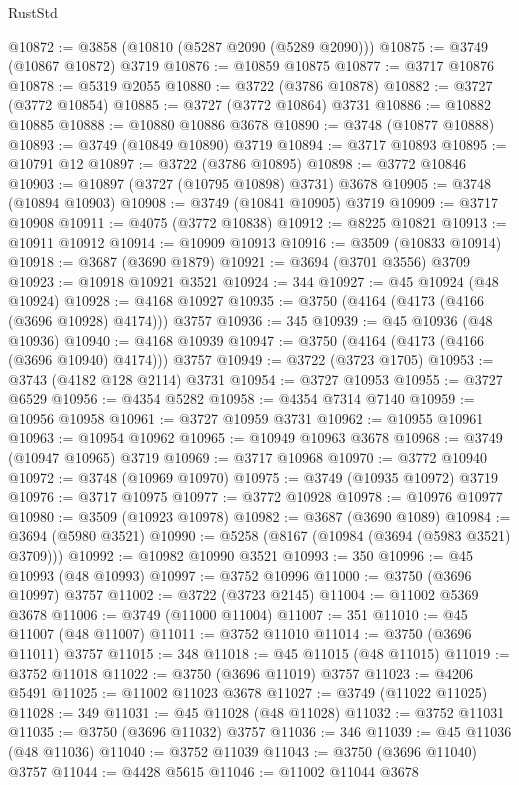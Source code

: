 \begin{lexlean}{RustStd}
\begin{coremodule}
@10872 := @3858 (@10810 (@5287 @2090 (@5289 @2090)))
@10875 := @3749 (@10867 @10872) @3719
@10876 := @10859 @10875
@10877 := @3717 @10876
@10878 := @5319 @2055
@10880 := @3722 (@3786 @10878)
@10882 := @3727 (@3772 @10854)
@10885 := @3727 (@3772 @10864) @3731
@10886 := @10882 @10885
@10888 := @10880 @10886 @3678
@10890 := @3748 (@10877 @10888)
@10893 := @3749 (@10849 @10890) @3719
@10894 := @3717 @10893
@10895 := @10791 @12
@10897 := @3722 (@3786 @10895)
@10898 := @3772 @10846
@10903 := @10897 (@3727 (@10795 @10898) @3731) @3678
@10905 := @3748 (@10894 @10903)
@10908 := @3749 (@10841 @10905) @3719
@10909 := @3717 @10908
@10911 := @4075 (@3772 @10838)
@10912 := @8225 @10821
@10913 := @10911 @10912
@10914 := @10909 @10913
@10916 := @3509 (@10833 @10914)
@10918 := @3687 (@3690 @1879)
@10921 := @3694 (@3701 @3556) @3709
@10923 := @10918 @10921 @3521
@10924 := 344
@10927 := @45 @10924 (@48 @10924)
@10928 := @4168 @10927
@10935 := @3750 (@4164 (@4173 (@4166 (@3696 @10928) @4174))) @3757
@10936 := 345
@10939 := @45 @10936 (@48 @10936)
@10940 := @4168 @10939
@10947 := @3750 (@4164 (@4173 (@4166 (@3696 @10940) @4174))) @3757
@10949 := @3722 (@3723 @1705)
@10953 := @3743 (@4182 @128 @2114) @3731
@10954 := @3727 @10953
@10955 := @3727 @6529
@10956 := @4354 @5282
@10958 := @4354 @7314 @7140
@10959 := @10956 @10958
@10961 := @3727 @10959 @3731
@10962 := @10955 @10961
@10963 := @10954 @10962
@10965 := @10949 @10963 @3678
@10968 := @3749 (@10947 @10965) @3719
@10969 := @3717 @10968
@10970 := @3772 @10940
@10972 := @3748 (@10969 @10970)
@10975 := @3749 (@10935 @10972) @3719
@10976 := @3717 @10975
@10977 := @3772 @10928
@10978 := @10976 @10977
@10980 := @3509 (@10923 @10978)
@10982 := @3687 (@3690 @1089)
@10984 := @3694 (@5980 @3521)
@10990 := @5258 (@8167 (@10984 (@3694 (@5983 @3521) @3709)))
@10992 := @10982 @10990 @3521
@10993 := 350
@10996 := @45 @10993 (@48 @10993)
@10997 := @3752 @10996
@11000 := @3750 (@3696 @10997) @3757
@11002 := @3722 (@3723 @2145)
@11004 := @11002 @5369 @3678
@11006 := @3749 (@11000 @11004)
@11007 := 351
@11010 := @45 @11007 (@48 @11007)
@11011 := @3752 @11010
@11014 := @3750 (@3696 @11011) @3757
@11015 := 348
@11018 := @45 @11015 (@48 @11015)
@11019 := @3752 @11018
@11022 := @3750 (@3696 @11019) @3757
@11023 := @4206 @5491
@11025 := @11002 @11023 @3678
@11027 := @3749 (@11022 @11025)
@11028 := 349
@11031 := @45 @11028 (@48 @11028)
@11032 := @3752 @11031
@11035 := @3750 (@3696 @11032) @3757
@11036 := 346
@11039 := @45 @11036 (@48 @11036)
@11040 := @3752 @11039
@11043 := @3750 (@3696 @11040) @3757
@11044 := @4428 @5615
@11046 := @11002 @11044 @3678

\end{coremodule}
\end{lexlean}
